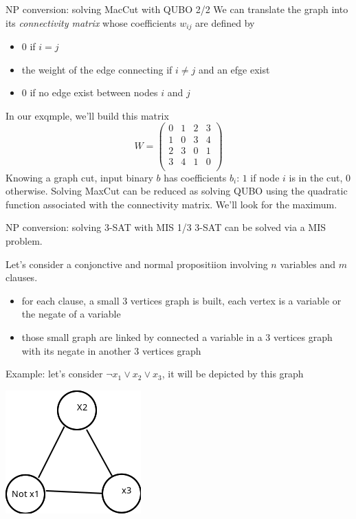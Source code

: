 \begin{frame}{NP conversion: solving MacCut with QUBO 2/2}
We can translate the graph into its \textit{connectivity matrix} whose coefficients  $w_{ij}$ are defined by
\begin{itemize}
    \item 0 if $i = j$ 
    \item the weight of the edge connecting  if $i \neq j$ and an efge exist
    \item 0 if no edge exist between nodes $i$ and $j$
\end{itemize}
In our exqmple, we'll build this matrix
\begin{equation*}
 W = \begin{pmatrix}
         0 & 1 & 2 & 3 \\
         1 & 0 & 3 & 4 \\
         2 & 3 & 0 & 1 \\
         3 & 4 & 1 & 0 \\
     \end{pmatrix}    
\end{equation*}
Knowing a graph cut, input binary $b$ has coefficients $b_i$: $1$ if node $i$ is in the cut, 0 otherwise.
Solving MaxCut can be reduced as solving QUBO using the quadratic function associated with the connectivity matrix.
We'll look for the maximum. 
\end{frame}

\begin{frame}{NP conversion: solving 3-SAT with MIS 1/3}
3-SAT can be solved via a MIS problem. 

Let's consider a conjonctive and normal propositiion involving $n$ variables and $m$ clauses.  

\begin{itemize}
    \item for each clause, a small 3 vertices graph is built, each vertex is a variable or the negate of a variable
    \item those small graph are linked by connected a variable in a 3 vertices graph with its negate in another
    3 vertices graph
\end{itemize}
Example: let's consider  $\lnot x_1 \lor x_2 \lor x_3$, it will be depicted by this graph


\centering
\includegraphics[scale=0.25]{images/Clause3SAT.png}
\end{frame}

